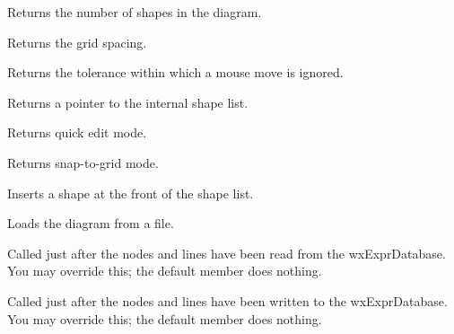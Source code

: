 \label{wxdiagramgetcount}


Returns the number of shapes in the diagram.



Returns the grid spacing.



Returns the tolerance within which a mouse move is ignored.



Returns a pointer to the internal shape list.



Returns quick edit mode.



Returns snap-to-grid mode.



Inserts a shape at the front of the shape list.



Loads the diagram from a file.



Called just after the nodes and lines have been read from the wxExprDatabase. You may override this;
the default member does nothing.



Called just after the nodes and lines have been written to the wxExprDatabase. You may override this;
the default member does nothing.

